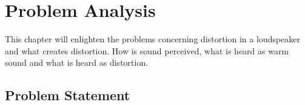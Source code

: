 \chapter{Problem Analysis}

This chapter will enlighten the problems concerning distortion in a loudspeaker and what creates distortion. How is sound perceived, what is heard as warm sound and what is heard as distortion. 









\section{Problem Statement}